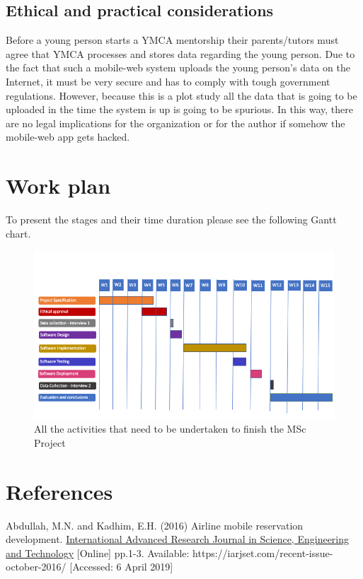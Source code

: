 \documentclass[version=last,fontsize=13pt]{scrartcl}
\begin{document}
\subsection{Ethical and practical considerations}
	Before a young person starts a YMCA mentorship their parents/tutors must agree that YMCA processes and stores data regarding the young person. Due to the fact that such a mobile-web system uploads the young person's data on the Internet, it must be very secure and has to comply with tough government regulations. However, because this is a plot study all the data that is going to be uploaded in the time the system is up is going to be spurious. In this way, there are no legal implications for the organization or for the author if somehow the mobile-web app gets hacked. 

\pagebreak
\section{Work plan}%
To present the stages and their time duration please see the following Gantt chart.

	\begin{figure}[H]

		\includegraphics[scale = 0.65, angle = 270]{./imgs/ganttChart}
		\caption{All the activities that need to be undertaken to finish the MSc Project}
		\label{gC}

	\end{figure}

\pagebreak

\section*{References}
Abdullah, M.N. and Kadhim, E.H. (2016) Airline mobile reservation development.  \underline{International Advanced Research Journal in Science, Engineering and Technology} [Online]  pp.1-3. Available: https://iarjset.com/recent-issue-october-2016/ [Accessed: 6 April 2019]\\
\end{document}
